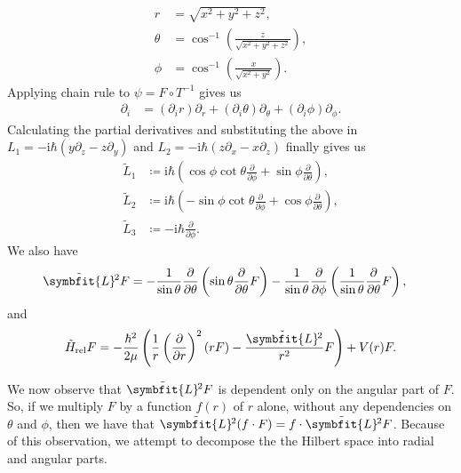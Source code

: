 \documentclass[12pt, a4 paper]{article}
\theoremstyle{definition}
\renewcommand{\i}{\mathrm{i}}
\newcommand{\angsone}{\tilde{L}_1}
\newcommand{\angstwo}{\tilde{L}_2}
\newcommand{\angsthree}{\tilde{L}_3}
\newcommand{\lvecsquare}{\tilde{\symbfit{L}}\kern-1pt^2}
\begin{document}
	\begin{align*}
		r      &= \sqrt{x^2 + y^2 + z^2},\\
		\theta &= \cos^{-1}{\left(\frac{z}{\sqrt{x^2 + y^2 + z^2}}\right)},\\
		\phi   &= \cos^{-1}{\left(\frac{x}{\sqrt{x^2 + y^2}}\right)}.
	\end{align*}
	Applying chain rule to $\psi = F \circ T^{-1}$ gives us
	\begin{align*}
	    \partial_i &= (\partial_i r)\partial_r + (\partial_i \theta)\partial_\theta + (\partial_i \phi)\partial_\phi.
	\end{align*}
	Calculating the partial derivatives and substituting the above in $L_1 = -\i\hbar(y\partial_z - z\partial_y)$ and $L_2 = -\i\hbar(z\partial_x - x\partial_z)$ finally gives us
	\begin{align*}
		\angsone &\coloneq \i\hbar\left(\cos{\phi}\cot{\theta}\frac{\partial}{\partial\phi} + \sin{\phi}\frac{\partial}{\partial\theta}\right),\\
		\angstwo &\coloneq \i\hbar\left(-\sin{\phi}\cot{\theta}\frac{\partial}{\partial\phi} + \cos{\phi}\frac{\partial}{\partial\theta}\right),\\
		\angsthree &\coloneq -\i\hbar \frac{\partial}{\partial\phi}.
	\end{align*}
	We also have
	\begin{align*}
		\lvecsquare F &= -\frac{1}{\sin{\theta}}\frac{\partial}{\partial \theta}\left(\sin{\theta}\frac{\partial}{\partial\theta}F\right) -\frac{1}{\sin{\theta}}\frac{\partial}{\partial\phi}\left(\frac{1}{\sin{\theta}}\frac{\partial}{\partial\theta}F\right),
	\end{align*}
	and
	\begin{align*}
		\tilde{H}_\text{rel} F = -\frac{\hbar^2}{2\mu}\left(\frac{1}{r}\left(\frac{\partial}{\partial r}\right)^2 (rF) - \frac{\lvecsquare}{r^2}F\right) + V(r)F.
	\end{align*}

	We now observe that $\lvecsquare F$ is dependent only on the angular part of $F$. So, if we multiply $F$ by a function $f(r)$ of $r$ alone, without any dependencies on $\theta$ and $\phi$, then we have that $\lvecsquare(f\cdot F) = f \cdot \lvecsquare F$. Because of this observation, we attempt to decompose the the Hilbert space into radial and angular parts.
\end{document}
